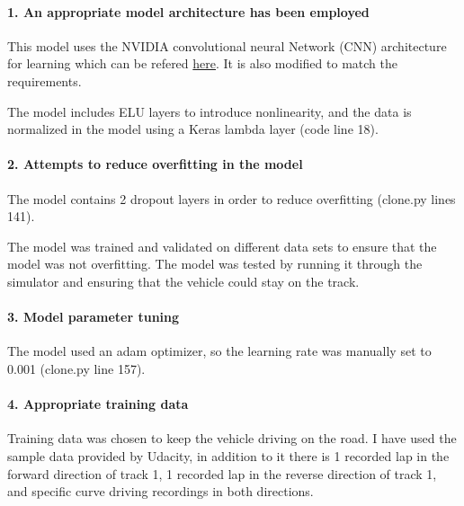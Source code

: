 \documentclass[11pt]{article}
\begin{document}
\hypertarget{an-appropriate-model-architecture-has-been-employed}{%
\paragraph{1. An appropriate model architecture has been
employed}\label{an-appropriate-model-architecture-has-been-employed}}

This model uses the NVIDIA convolutional neural Network (CNN)
architecture for learning which can be refered
\href{https://images.nvidia.com/content/tegra/automotive/images/2016/solutions/pdf/end-to-end-dl-using-px.pdf}{here}.
It is also modified to match the requirements.

The model includes ELU layers to introduce nonlinearity, and the data is
normalized in the model using a Keras lambda layer (code line 18).

\hypertarget{attempts-to-reduce-overfitting-in-the-model}{%
\paragraph{2. Attempts to reduce overfitting in the
model}\label{attempts-to-reduce-overfitting-in-the-model}}

The model contains 2 dropout layers in order to reduce overfitting
(clone.py lines 141).

The model was trained and validated on different data sets to ensure
that the model was not overfitting. The model was tested by running it
through the simulator and ensuring that the vehicle could stay on the
track.

\hypertarget{model-parameter-tuning}{%
\paragraph{3. Model parameter tuning}\label{model-parameter-tuning}}

The model used an adam optimizer, so the learning rate was manually set
to 0.001 (clone.py line 157).

\hypertarget{appropriate-training-data}{%
\paragraph{4. Appropriate training
data}\label{appropriate-training-data}}

Training data was chosen to keep the vehicle driving on the road. I have
used the sample data provided by Udacity, in addition to it there is 1
recorded lap in the forward direction of track 1, 1 recorded lap in the
reverse direction of track 1, and specific curve driving recordings in
both directions.
\end{document}
